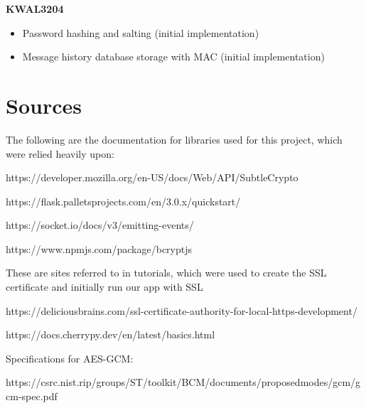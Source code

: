 \documentclass[12pt]{article}
\begin{document}
\textbf{KWAL3204}

\begin{itemize}
\item Password hashing and salting (initial implementation)
\item Message history database storage with MAC (initial implementation)
\end{itemize}

\section{Sources}

The following are the documentation for libraries used for this project, which were relied heavily upon:

https://developer.mozilla.org/en-US/docs/Web/API/SubtleCrypto

https://flask.palletsprojects.com/en/3.0.x/quickstart/

https://socket.io/docs/v3/emitting-events/

https://www.npmjs.com/package/bcryptjs

These are sites referred to in tutorials, which were used to create the SSL certificate and initially run our app with SSL

https://deliciousbrains.com/ssl-certificate-authority-for-local-https-development/

https://docs.cherrypy.dev/en/latest/basics.html

Specifications for AES-GCM:

https://csrc.nist.rip/groups/ST/toolkit/BCM/documents/proposedmodes/gcm/gcm-spec.pdf
\end{document}
